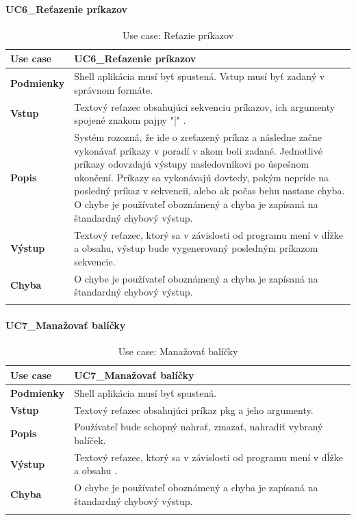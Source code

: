 \paragraph{UC6\_Reťazenie príkazov}
\begin{center}
	\begin{longtable}{|p{2.5cm}|p{12.2cm}|}

			\hline
			\textbf{Use case} & UC6\_Reťazenie príkazov \\ 
			\hline
			\textbf{Podmienky} & Shell aplikácia musí byť spustená. Vstup musí byť zadaný v správnom formáte.\\ 
			\hline
			\textbf{Vstup} & Textový reťazec obsahujúci sekvenciu príkazov, ich argumenty spojené znakom pajpy "|" .\\
			\hline
			\textbf{Popis} & Systém rozozná, že ide o zreťazený príkaz a následne začne vykonávať príkazy v poradí v akom boli zadané. Jednotlivé príkazy odovzdajú  výstupy nasledovníkovi po úspešnom ukončení. Príkazy sa vykonávajú dovtedy, pokým nepríde na posledný príkaz v sekvencii, alebo ak počas behu nastane chyba. O chybe je používateľ oboznámený a chyba je zapísaná na štandardný chybový výstup. \\ 
			\hline

			\textbf{Výstup} & Textový reťazec, ktorý sa v závislosti od programu mení v dĺžke a obsahu, výstup bude vygenerovaný posledným príkazom sekvencie.\\
			\hline

			\textbf{Chyba} & O chybe je používateľ oboznámený a chyba je zapísaná na štandardný chybový výstup.\\
			\hline
	\caption{Use case: Reťazie príkazov}
	\label{table:1}

	\end{longtable}
\end{center}


\paragraph{UC7\_Manažovať balíčky}
\begin{center}
	\begin{longtable}{|p{2.5cm}|p{12.2cm}|}

			\hline
			\textbf{Use case} & UC7\_Manažovať balíčky \\ 
			\hline
			\textbf{Podmienky} & Shell aplikácia musí byť spustená.\\ 
			\hline
			\textbf{Vstup} & Textový reťazec obsahujúci príkaz pkg a jeho argumenty.\\
			\hline
			\textbf{Popis} & Používateľ bude schopný nahrať, zmazať, nahradiť vybraný balíček. \\ 
			\hline
			\textbf{Výstup} & Textový reťazec, ktorý sa v závislosti od programu mení v dĺžke a obsahu .\\
			\hline
			\textbf{Chyba} & O chybe je používateľ oboznámený a chyba je zapísaná na štandardný chybový výstup.\\
			\hline
	\caption{Use case: Manažovať balíčky}
	\label{table:1}

	\end{longtable}
\end{center}
